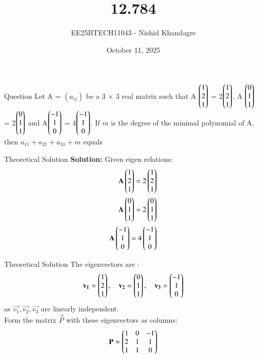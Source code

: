 \documentclass{beamer}
\title{12.784}
\date{October 11, 2025}
\author{EE25BTECH11043 - Nishid Khandagre}
\begin{document}
\frame{\titlepage}

\begin{frame}{Question}
Let A = $(a_{ij})$ be a 3 $\times$ 3 real matrix such that
A $\begin{pmatrix}1\\2\\1\end{pmatrix}$ = 2$\begin{pmatrix}1\\2\\1\end{pmatrix}$, A $\begin{pmatrix}0\\1\\1\end{pmatrix}$ = 2$\begin{pmatrix}0\\1\\1\end{pmatrix}$ and A$\begin{pmatrix}-1\\1\\0\end{pmatrix}$ = 4$\begin{pmatrix}-1\\1\\0\end{pmatrix}$.
If $m$ is the degree of the minimal polynomial of A, then $a_{11} + a_{21} + a_{31} + m$ equals
\end{frame}

\begin{frame}{Theoretical Solution}
\textbf{Solution: }
Given eigen relations:
\begin{align}
\mathbf{A} \begin{pmatrix}1\\2\\1\end{pmatrix} = 2\begin{pmatrix}1\\2\\1\end{pmatrix} \\
\mathbf{A} \begin{pmatrix}0\\1\\1\end{pmatrix} = 2\begin{pmatrix}0\\1\\1\end{pmatrix} \\
\mathbf{A} \begin{pmatrix}-1\\1\\0\end{pmatrix} = 4\begin{pmatrix}-1\\1\\0\end{pmatrix}
\end{align}
\end{frame}

\begin{frame}{Theoretical Solution}
The eigenvectors are :
\begin{align}
\mathbf{v_1} = \begin{pmatrix}1\\2\\1\end{pmatrix}, \quad
\mathbf{v_2} = \begin{pmatrix}0\\1\\1\end{pmatrix}, \quad
\mathbf{v_3} = \begin{pmatrix}-1\\1\\0\end{pmatrix}
\end{align}
as $\vec{v_1},\vec{v_2},\vec{v_3}$ are linearly independent.\\

Form the matrix $\vec{P}$ with these eigenvectors as columns:
\begin{align}
\mathbf{P} = \begin{pmatrix}
1 & 0 & -1 \\
2 & 1 & 1 \\
1 & 1 & 0
\end{pmatrix}
\end{align}
\end{frame}
\end{document}

